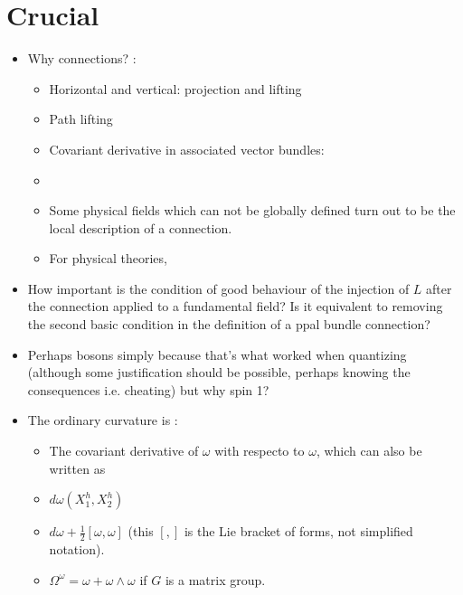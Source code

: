 \section{Crucial}
\begin{itemize}
    \item Why connections? \label{whyConnections}:
    \begin{itemize}
        \item Horizontal and vertical: projection and lifting
        
        \item Path lifting
        
        \item Covariant derivative in associated vector bundles:
        
        \item {}
        
        \item Some physical fields which can not be globally defined turn out to be the local description of a connection.  
        
        \item For  physical theories, 
    \end{itemize}
    
    \item How important is the condition of good behaviour of the injection of $L$ after the connection applied to a fundamental field? Is it equivalent to removing the second basic condition in the definition of a ppal bundle connection? \label{whyGoodInjection}
    
    \item {} Perhaps bosons simply because that's what worked when quantizing (although some justification should be possible, perhaps knowing the consequences i.e. cheating) but why spin 1?
    
    \item The ordinary curvature is \label{ordinaryCurvatureIs}:
    \begin{itemize}
        \item The covariant derivative of $\omega$ with respecto to $\omega$, which can also be written as
        \item $d\omega(X_1^h, X_2^h)$
        \item $d\omega + \frac{1}{2}[\omega,\omega]$ (this $[,]$ is the Lie bracket of forms, not simplified notation).
        \item $\Omega^\omega = \omega + \omega \wedge \omega$ if $G$ is a matrix group.
        

\end{itemize}
\end{itemize}
